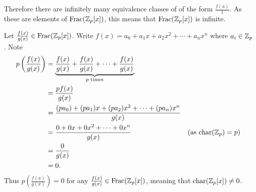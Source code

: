 \begin{questions}
\begin{partquestions}{\alph*}
        Therefore there are infinitely many equivalence classes of of the form $\frac{f(x)}1$. As these are elements of $\mathrm{Frac}(\mathbb{Z}_p[x])$, this means that $\mathrm{Frac}(\mathbb{Z}_p[x])$ is infinite.

        \item Let $\frac{f(x)}{g(x)} \in \mathrm{Frac}(\mathbb{Z}_p[x])$. Write $f(x) = a_0 + a_1x + a_2x^2 + \cdots + a_nx^n$ where $a_i \in \mathbb{Z}_p$. Note
        \begin{align*}
            p\left(\frac{f(x)}{g(x)}\right) &= \underbrace{\frac{f(x)}{g(x)} + \frac{f(x)}{g(x)} + \cdots + \frac{f(x)}{g(x)}}_{p \text{ times}}\\
            &= \frac{pf(x)}{g(x)}\\
            &= \frac{(pa_0) + (pa_1)x + (pa_2)x^2 + \cdots + (pa_n)x^n}{g(x)}\\
            &= \frac{0 + 0x + 0x^2 + \cdots + 0x^n}{g(x)} & (\text{as }\mathrm{char}(\mathbb{Z}_p) = p)\\
            &= \frac0{g(x)}\\
            &= 0.
        \end{align*}
        Thus $p\left(\frac{f(x)}{g(x)}\right) = 0$ for any $\frac{f(x)}{g(x)} \in \mathrm{Frac}(\mathbb{Z}_p[x])$, meaning that $\mathrm{char}(\mathbb{Z}_p[x]) \neq 0$.
    \end{partquestions}
\end{questions}
